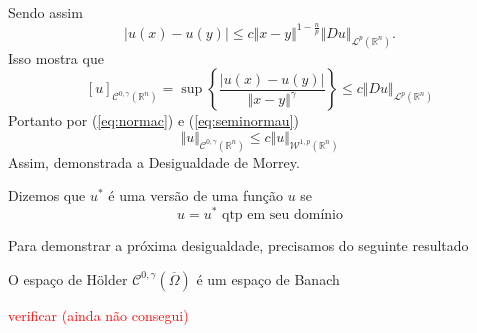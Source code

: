 \documentclass[a4paper, 11pt]{book}
\theoremstyle{definition}
\newcommand{\bR}{\mathbb{R}}
\newcommand{\cC}{\mathcal{C}}
\newcommand{\cL}{\mathcal{L}}
\newcommand{\cW}{\mathcal{W}}
\begin{document}
\begin{prf}
    Sendo assim
    \[
        |u(x) - u(y)| \leqslant c \Vert x - y \Vert^{1 - \frac{n}{p}} \Vert Du \Vert_{\cL^p(\bR^n)}.
    \]
    Isso mostra que
    \begin{equation} \label{eq:seminormau}
        [u]_{\cC^{0,\gamma}(\bR^n)} = \sup \left\{ \frac{|u(x) - u(y)|}{\Vert x - y \Vert^{\gamma}} \right\} \leqslant c \Vert Du \Vert_{\cL^p(\bR^n)}
    \end{equation}
    Portanto por (\ref{eq:normac}) e (\ref{eq:seminormau})
    \[
        \Vert u \Vert_{\cC^{0,\gamma}(\bR^n)} \leqslant c \Vert u \Vert_{\cW^{1,p}(\bR^n)}
    \]
    Assim, demonstrada a Desigualdade de Morrey.
\end{prf}

\begin{dbox}
    Dizemos que $u^*$ é uma versão de uma função $u$ se
    \[
        u = u^* \text{ qtp em seu domínio}
    \]
\end{dbox}

Para demonstrar a próxima desigualdade, precisamos do seguinte resultado

\begin{tbox}
    O espaço de Hölder $\cC^{0,\gamma}(\overline\Omega)$ é um espaço de Banach
\end{tbox}
\begin{prf}
    \textcolor{red}{verificar (ainda não consegui)}
\end{prf}
\end{document}
